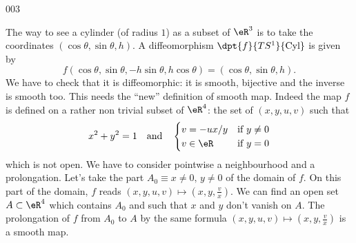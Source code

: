 \begin{corrige}{003}
\newcommand{\CaptionFigALIzHFm}{A possible mistake is to confuse $T_{z_1}S^1$ and $T_{z_2}S^1$.}




The way to see a cylinder (of radius $1$) as a subset of $\eR^3$ is to take the coordinates $(\cos\theta,\sin\theta,h)$. A diffeomorphism $\dpt{ f }{ TS^1 }{ \text{Cyl} }$ is given by
\begin{equation}
f(\cos\theta,\sin\theta,-h\sin\theta,h\cos\theta)=(\cos\theta,\sin\theta,h).
\end{equation}
We have to check that it is diffeomorphic: it is smooth, bijective and the inverse is smooth too. This needs the ``new'' definition of smooth map. Indeed the map $f$ is defined on a rather non trivial subset of $\eR^4$: the set of $(x,y,u,v)$ such that
\[ 
x^2+y^2=1 \quad \text{and} \quad
\begin{cases}
 v=-ux/y&\text{if $y\neq 0$}\\
 v\in\eR&\text{if $y=0$}
\end{cases}
\]
which is not open. We have to consider pointwise a neighbourhood and a prolongation. Let's take the part $A_0\equiv x\neq 0,\,y\neq 0$ of the domain of $f$. On this part of the domain, $f$ reads $(x,y,u,v)\mapsto(x,y,\frac{ v }{ x })$. We can find an open set $A\subset\eR^4$ which contains $A_0$ and such that $x$ and $y$ don't vanish on $A$. The prolongation of $f$ from $A_0$ to $A$ by the same formula $(x,y,u,v)\mapsto(x,y,\frac{ v }{ x })$ is a smooth map.


\end{corrige}
